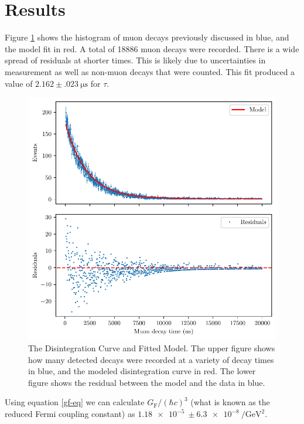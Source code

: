 \documentclass[%
 reprint,
 amsmath,amssymb,
 aps,
]{revtex4-2}
\begin{document}
\section{Results}
Figure \ref{fig:results} shows the histogram of muon decays previously discussed in blue, and the model fit in red. A total of 18886 muon decays were recorded. There is a wide spread of residuals at shorter times. This is likely due to uncertainties in measurement as well as non-muon decays that were counted. This fit produced a value of $2.162\pm \SI{.023}{\micro\second}$ for $\tau$.
\begin{figure}[t]
	\centering
	\includegraphics{../python/muon-histogram.pdf}
	\caption{\label{fig:results}The Disintegration Curve and Fitted Model. The upper figure shows how many detected decays were recorded at a variety of decay times in blue, and the modeled disintegration curve in red. The lower figure shows the residual between the model and the data in blue.}
\end{figure}
Using equation \ref{gf-eq} we can calculate $G_\mathrm{F}/(\hbar c)^3$ (what is known as the reduced Fermi coupling constant) as $\SI{1.18e-5}{}\pm\SI{6.3e-8}{\per\giga\electronvolt\squared}$.
\end{document}
